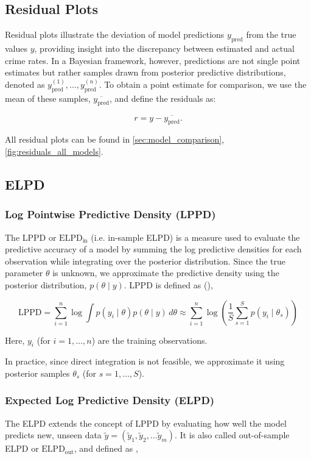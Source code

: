 \documentclass[12pt]{article}
\begin{document}
\subsection{Residual Plots}\label{residual_plot}

Residual plots illustrate the deviation of model predictions \( y_{\text{pred}} \) from the true values \( y \), providing insight into the discrepancy between estimated and actual crime rates. In a Bayesian framework, however, predictions are not single point estimates but rather samples drawn from posterior predictive distributions, denoted as \( y_{\text{pred}}^{(1)}, \dots, y_{\text{pred}}^{(n)} \). To obtain a point estimate for comparison, we use the mean of these samples, \( \overline{y_{\text{pred}}} \), and define the residuals as:  

\[
r = y - \overline{y_{\text{pred}}}.
\]

All residual plots can be found in \autoref{sec:model_comparison}, \autoref{fig:residuals_all_models}.


\subsection{ELPD}


\subsubsection*{Log Pointwise Predictive Density (LPPD)}  
The LPPD or $\text{ELPD}_{\text{in}}$ (i.e. in-sample ELPD) is a measure used to evaluate the predictive accuracy of a model by summing the log predictive densities for each observation while integrating over the posterior distribution. Since the true parameter \(\theta\) is unknown, we approximate the predictive density using the posterior distribution, \( p(\theta \mid y) \). LPPD is defined as (\cite{gelman2013bayesian}),  

\[
\text{LPPD} = \sum_{i=1}^{n} \log \int p(y_i \mid \theta) p(\theta \mid y) \, d\theta \approx \sum_{i=1}^{n} \log \left( \frac{1}{S} \sum_{s=1}^{S} p(y_i \mid \theta_s) \right)
\]  

Here, $y_{i}$ (for \( i = 1, \dots, n \)) are the training observations.


In practice, since direct integration is not feasible, we approximate it using posterior samples \( \theta_s \) (for \( s = 1, \dots, S \)).


\subsubsection*{Expected Log Predictive Density (ELPD)}  
The ELPD extends the concept of LPPD by evaluating how well the model predicts new, unseen data \( \tilde{y} = (\tilde{y}_1, \tilde{y}_2, \dots \tilde{y}_m)\). It is also called out-of-sample ELPD or $\text{ELPD}_{\text{out}}$, and defined as \parencite{gelman2013bayesian},  
\end{document}
